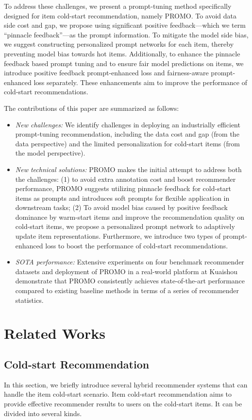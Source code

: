 \documentclass[sigconf]{acmart}
\newcommand{\sys}{\textsc{PROMO}\xspace}
\begin{document}
To address these challenges, we present a prompt-tuning method specifically designed for item cold-start recommendation, namely \sys. 
To avoid data side cost and gap, we propose using significant positive feedback---which we term ``pinnacle feedback''---as the prompt information.
To mitigate the model side bias, we suggest constructing personalized prompt networks for each item, thereby preventing model bias towards hot items. 
Additionally, to enhance the pinnacle feedback based prompt tuning and to ensure fair model predictions on items, we introduce positive feedback prompt-enhanced loss and fairness-aware prompt-enhanced loss separately. 
These enhancements aim to improve the performance of cold-start recommendations.

The contributions of this paper are summarized as follows: 
\begin{itemize}[leftmargin=*]
\item {\it New challenges:} We identify challenges in deploying an industrially efficient prompt-tuning recommendation, including the data cost and gap (from the data perspective) and the limited personalization for cold-start items (from the model perspective).
\item {\it New technical solutions:} \sys makes the initial attempt to address both the challenges: (1) to avoid extra annotation cost and boost recommender performance, \sys suggests utilizing pinnacle feedback for cold-start items as prompts and introduces soft prompts for flexible application in downstream tasks; (2) To avoid model bias caused by positive feedback dominance by warm-start items and improve the recommendation quality on cold-start items, we propose a personalized prompt network to adaptively update item representations. 
Furthermore, we introduce two types of prompt-enhanced loss to boost the performance of cold-start recommendations.
\item {\it SOTA performance:} Extensive experiments on four benchmark recommender datasets and deployment of \sys in a real-world platform at Kuaishou demonstrate that \sys consistently achieves state-of-the-art performance compared to existing baseline methods in terms of a series of recommender statistics.
\end{itemize}

\section{Related Works}
\subsection{Cold-start Recommendation}
In this section, we briefly introduce several hybrid recommender systems that can handle the item cold-start scenario.
Item cold-start recommendation aims to provide effective recommender results to users on the cold-start items. 
It can be divided into several kinds. 
\end{document}
